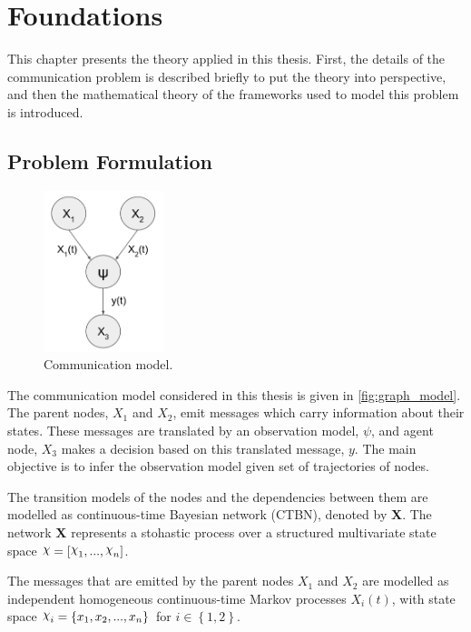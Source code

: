 \chapter{Foundations}
\label{chap:2}

This chapter presents the theory applied in this thesis. First, the details of the communication problem is described briefly to put the theory into perspective, and then the mathematical theory of the frameworks used to model this problem is introduced. 

\section{Problem Formulation}
\label{sec:prob_formulation}
\begin{figure}
	\begin{center}
		\includegraphics[width=3.5cm]{figures/simple_graph}
		\caption{Communication model.}
	\end{center}
	\label{fig:graph_model}
\end{figure} 
The communication model considered in this thesis is given in \autoref{fig:graph_model}. The parent nodes, $X_{1}$ and $ X_{2}$, emit messages which carry information about their states. These messages are translated by an observation model, $\psi$, and agent node, $ X_{3} $ makes a decision based on this translated message, $ y $. The main objective is to infer the observation model given set of trajectories of nodes.

The transition models of the nodes and the dependencies between them are modelled as continuous-time Bayesian network (CTBN), denoted by \textbf{X}. The network \textbf{X} represents a stohastic process over a structured multivariate state space $ \rchi = [\rchi_1,..., \rchi_n] $. 

The messages that are emitted by the parent nodes $X_{1}$ and $ X_{2} $ are modelled as independent homogeneous continuous-time Markov processes $X_{i}(t)$, with state space $ \rchi_{i} = \left\lbrace x_{1}, x_{2}, ..., x_{n} \right\rbrace  $ for $ i \in \left\lbrace 1,2 \right\rbrace $.

